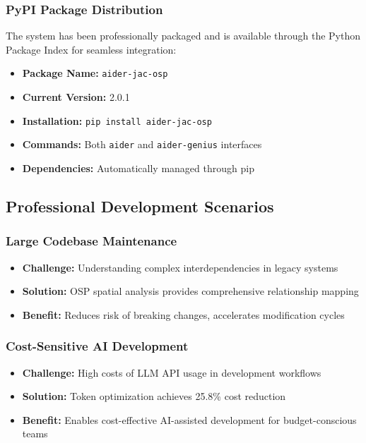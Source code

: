 \documentclass[12pt,a4paper]{article}
\begin{document}
\subsubsection{PyPI Package Distribution}
The system has been professionally packaged and is available through the Python Package Index for seamless integration:

\begin{itemize}
    \item \textbf{Package Name:} \texttt{aider-jac-osp}
    \item \textbf{Current Version:} 2.0.1
    \item \textbf{Installation:} \texttt{pip install aider-jac-osp}
    \item \textbf{Commands:} Both \texttt{aider} and \texttt{aider-genius} interfaces
    \item \textbf{Dependencies:} Automatically managed through pip
\end{itemize}

\subsection{Professional Development Scenarios}

\subsubsection{Large Codebase Maintenance}
\begin{itemize}
    \item \textbf{Challenge:} Understanding complex interdependencies in legacy systems
    \item \textbf{Solution:} OSP spatial analysis provides comprehensive relationship mapping
    \item \textbf{Benefit:} Reduces risk of breaking changes, accelerates modification cycles
\end{itemize}

\subsubsection{Cost-Sensitive AI Development}
\begin{itemize}
    \item \textbf{Challenge:} High costs of LLM API usage in development workflows
    \item \textbf{Solution:} Token optimization achieves 25.8\% cost reduction
    \item \textbf{Benefit:} Enables cost-effective AI-assisted development for budget-conscious teams
\end{itemize}
\end{document}
